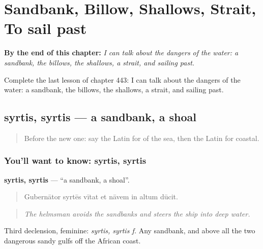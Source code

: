 
\chapter{Sandbank, Billow, Shallows, Strait, To sail past}
\label{ch:la-sandbank-billow-shallows-strait-to-sail-past}

\begin{chapteropening}
\textbf{By the end of this chapter:} \emph{I can talk about the dangers of the water: a sandbank, the billows, the shallows, a strait, and sailing past.}

Complete the last lesson of chapter 443: I can talk about the dangers of the water: a sandbank, the billows, the shallows, a strait, and sailing past.
\end{chapteropening}

\section[syrtis, syrtis]{syrtis, syrtis — a sandbank, a shoal}

\label{lesson:LA-C443-syrtis}



\begin{quote}
Before the new one: say the Latin for of the sea, then the Latin for coastal.
\end{quote}

\subsection*{You'll want to know: syrtis, syrtis}
\textbf{syrtis, syrtis} — \textquotedblleft{}a sandbank, a shoal\textquotedblright{}.

\begin{quote}
Gubernātor syrtēs vītat et nāvem in altum dūcit.
\end{quote}

\begin{quote}
\emph{The helmsman avoids the sandbanks and steers the ship into deep water.}
\end{quote}

Third declension, feminine: \emph{syrtis, syrtis f.} Any sandbank, and above all the two dangerous sandy gulfs off the African coast.

